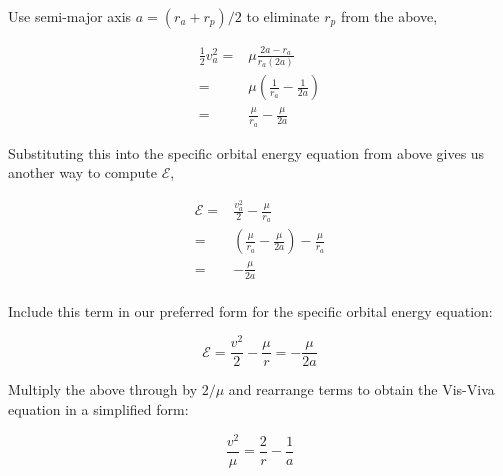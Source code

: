 \documentclass[10pt]{article}
\begin{document}
\pagebreak
Use semi-major axis \(a = \left(r_a + r_p\right) / 2\)
to eliminate \(r_p\) from the above,

\begin{equation*}
\begin{split}
\frac{1}{2} v_a^2
   ={} & \mu \frac{2 a - r_a}{r_a \left( 2 a \right)}
\\ ={} & \mu \left( \frac{1}{r_a} - \frac{1}{2 a}\right)
\\ ={} & \frac{\mu}{r_a} - \frac{\mu}{2 a}
\end{split}
\end{equation*}

Substituting this into the specific orbital
energy equation from above gives us another
way to compute \(\mathcal{E}\),

\begin{equation*}
\begin{split}
\mathcal{E}
={} & \frac{v_a^2}{2} - \frac{\mu}{r_a}
\\ ={} & \left( \frac{\mu}{r_a} - \frac{\mu}{2 a} \right) - \frac{\mu}{r_a}
\\ ={} & -\frac{\mu}{2a} \\
\end{split}
\end{equation*}

Include this term in our preferred form
for the specific orbital energy equation:

\begin{equation*}
\boxed{\mathcal{E} = \frac{v^2}{2} - \frac{\mu}{r} = -\frac{\mu}{2a}}
\end{equation*}

Multiply the above through by \(2/\mu\) and rearrange terms
to obtain the Vis-Viva equation in a simplified form:

\begin{equation*}
\boxed{\frac{v^2}{\mu} = \frac{2}{r} - \frac{1}{a}}
\end{equation*}
\end{document}
